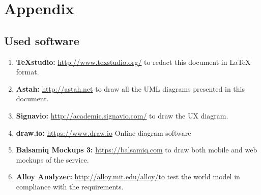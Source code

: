 \documentclass[english]{article}
\newcounter{requirement}
\begin{document}
	\newpage{}
	
	
	\pagebreak
	
	\pagebreak
	
	\pagebreak
	
	\pagebreak
	
	\pagebreak
	\section{Appendix}
	
	\subsection{Used software}
	\begin{enumerate}
		\item \textbf{TeXstudio:} \url{http://www.texstudio.org/} to redact this document in {\LaTeX} format.
		\item \textbf{Astah:} \url{http://astah.net} to draw all the UML diagrams presented in this document.
		\item \textbf{Signavio:} \url{http://academic.signavio.com/} to draw the UX diagram.
		\item \textbf{draw.io:} \url{https://www.draw.io} Online diagram software
		\item \textbf{Balsamiq Mockups 3:} \url{https://balsamiq.com} to draw both mobile and web mockups of the service.
		\item \textbf{Alloy Analyzer:}  \url{http://alloy.mit.edu/alloy/}to test the world model in compliance with the requirements.
	\end{enumerate}
	
\end{document}
